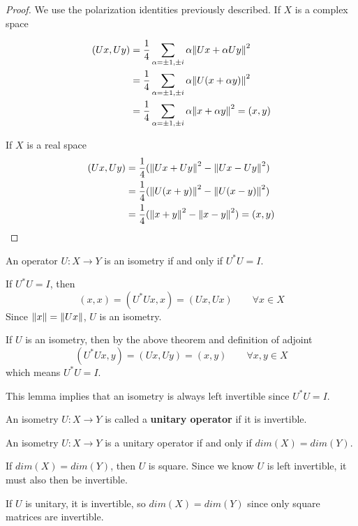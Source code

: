 \begin{proof}
We use the polarization identities previously described. If $X$ is a complex space

$$
\begin{aligned}
(Ux, Uy) &= \frac{1}{4} \sum_{\alpha = \pm 1, \pm i} \alpha \norm{Ux + \alpha Uy}^{2} \\ 
&= \frac{1}{4} \sum_{\alpha = \pm 1, \pm i} \alpha \norm{U(x + \alpha y)}^{2} \\
&= \frac{1}{4} \sum_{\alpha = \pm 1, \pm i} \alpha \norm{x + \alpha y}^{2} = (x, y)
\end{aligned}
$$

If $X$ is a real space 
$$\begin{aligned} 
(Ux, Uy) &= \frac{1}{4}(\norm{Ux + Uy}^{2} - \norm{Ux - Uy}^{2}) \\
&= \frac{1}{4} (\norm{U(x + y)}^{2} - \norm{U(x - y)}^{2}) \\
&= \frac{1}{4} (\norm{x + y}^{2} - \norm{x - y}^{2}) = (x, y)
\end{aligned}
$$
\end{proof}

\begin{lemma}
An operator $U: X \rightarrow Y$ is an isometry if and only if $U^{*}U = I$. 
\end{lemma}

\begin{lproof}
If $U^{*}U = I$, then 
$$(x, x) = (U^{*}Ux, x) = (Ux, Ux) \qquad \forall x \in X$$
Since $\norm{x} = \norm{Ux}$, $U$ is an isometry. 

If $U$ is an isometry, then by the above theorem and definition of adjoint
$$(U^{*} Ux, y) = (Ux, Uy) = (x, y) \qquad \forall x, y \in X$$
which means $U^{*}U = I$. 
\end{lproof}

This lemma implies that an isometry is always left invertible since $U^{*}U = I$. 

\begin{definition}
An isometry $U: X \rightarrow Y$ is called a \textbf{unitary operator} if it is invertible.  
\end{definition}

\begin{lemma}
An isometry $U: X \rightarrow Y$ is a unitary operator if and only if $dim(X) = dim(Y)$. 
\end{lemma}

\begin{lproof}
If $dim(X) = dim(Y)$, then $U$ is square. Since we know $U$ is left invertible, it must also then be invertible. 

If $U$ is unitary, it is invertible, so $dim(X) = dim(Y)$ since only square matrices are invertible. 
\end{lproof}

